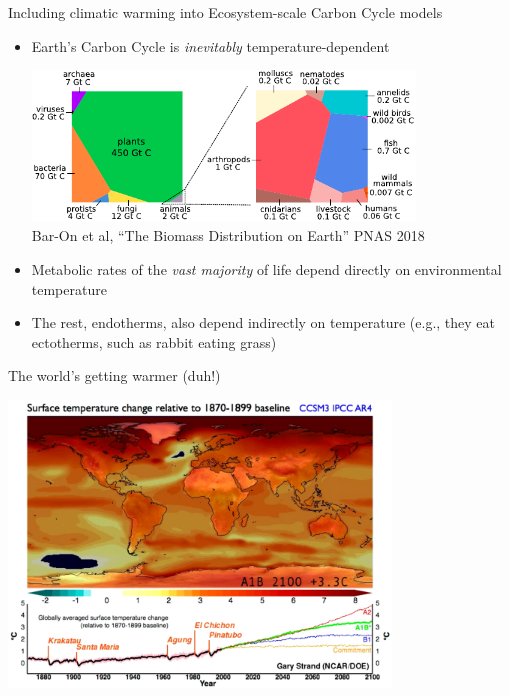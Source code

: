 \documentclass[xcolor={usenames,x11names},compress]{beamer}
\renewcommand{\(}{\begin{columns}}
\renewcommand{\)}{\end{columns}}
\newcommand{\<}[1]{\begin{column}{#1}}
\renewcommand{\>}{\end{column}}
\begin{document}
\begin{frame}{Including climatic warming into Ecosystem-scale Carbon Cycle models}

  \begin{itemize}[<+->]\setlength{\itemindent}{0em}\itemsep2pt
    \item Earth's Carbon Cycle is {\it inevitably} temperature-dependent

  \begin{center}
    \includegraphics[width=0.8\textwidth]{Bar-on_et_al.pdf}\\
    {\tiny Bar-On et al, ``The Biomass Distribution on Earth'' PNAS 2018}
  \end{center}\par

    \item Metabolic rates of the {\it vast majority} of life depend directly on environmental temperature
    \item The rest, endotherms, also depend indirectly on temperature (e.g., they eat ectotherms, such as rabbit eating grass)
  \end{itemize}

  \end{frame}

\begin{frame}{The world's getting warmer (duh!)}

  \centering
  \includegraphics[width=4in]{Warming.png}

\end{frame}
\end{document}
